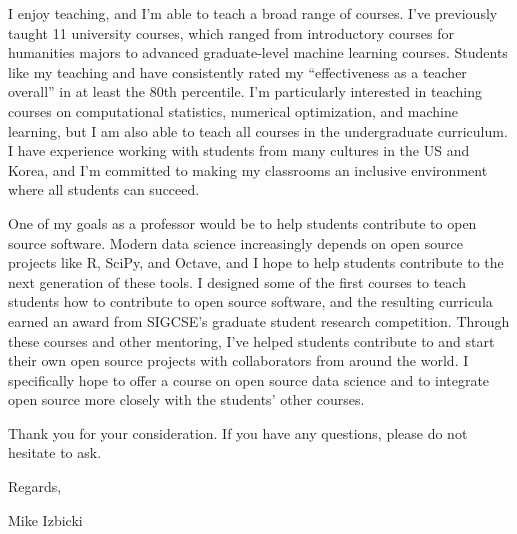\documentclass[12pt]{article}
\begin{document}
\noindent
I enjoy teaching,
and I'm able to teach a broad range of courses.
I've previously taught 11 university courses,
which ranged from introductory courses for humanities majors to advanced graduate-level machine learning courses.
Students like my teaching and have consistently rated my ``effectiveness as a teacher overall'' in at least the 80th percentile.
I'm particularly interested in teaching courses on computational statistics, numerical optimization, and machine learning,
but I am also able to teach all courses in the undergraduate curriculum.
I have experience working with students from many cultures in the US and Korea,
and I'm committed to making my classrooms an inclusive environment where all students can succeed.

\noindent
One of my goals as a professor would be to help students contribute to open source software.
Modern data science increasingly depends on open source projects like R, SciPy, and Octave,
and I hope to help students contribute to the next generation of these tools.
I designed some of the first courses to teach students how to contribute to open source software,
and the resulting curricula earned an award from SIGCSE's graduate student research competition.
Through these courses and other mentoring, 
I've helped students contribute to and start their own open source projects with collaborators from around the world.
I specifically hope to offer a course on open source data science 
and to integrate open source more closely with the students' other courses.

\noindent
Thank you for your consideration.
If you have any questions,
please do not hesitate to ask.

\noindent
Regards,

\vspace{-0.10in}
\noindent
Mike Izbicki
\end{document}
